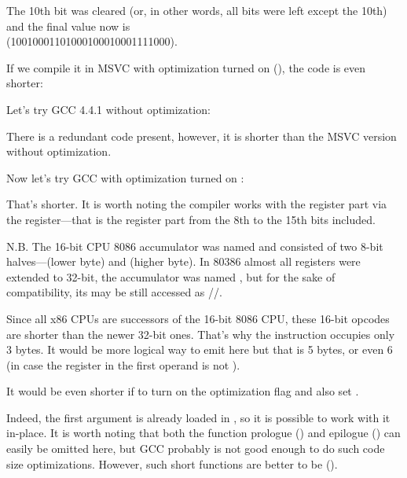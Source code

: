 The 10th bit was cleared (or, in other words, all bits were left except the 10th) and the final value now is \\
 (1001000110100010001{\color{red}0}001111000).


If we compile it in MSVC with optimization turned on (\Ox), the code is even shorter:




Let's try GCC 4.4.1 without optimization:



There is a redundant code present, however, it is shorter than the MSVC version without optimization.

Now let's try GCC with optimization turned on \Othree:




That's shorter.
It is worth noting the compiler works with the \EAX register part via the \AH register---that is the \EAX register part from the 8th to the 15th bits included.


N.B.  The 16-bit CPU 8086 accumulator was named \AX and consisted of two 8-bit 
halves---\AL (lower byte) and \AH (higher byte).
In 80386 almost all registers were extended to 32-bit, the accumulator was named \EAX, 
but for the sake of compatibility,
its  may be still accessed as \AX/\AH/\AL.

Since all x86 CPUs are successors of the 16-bit 8086 CPU, these  16-bit opcodes are shorter 
than the newer 32-bit ones.
That's why the  instruction occupies only 3 bytes.
It would be more logical way to emit here 
but that is 5 bytes, or even 6
(in case the register in the first operand is not \EAX).


It would be even shorter if to turn on the \Othree optimization flag and also set .




Indeed, the first argument is already loaded in \EAX, so it is possible to work with it in-place.
It is worth noting that both the function prologue () and epilogue ()
can easily be omitted here, but GCC probably is not good enough to do such code size optimizations.
However, such short functions are better to be  ().
